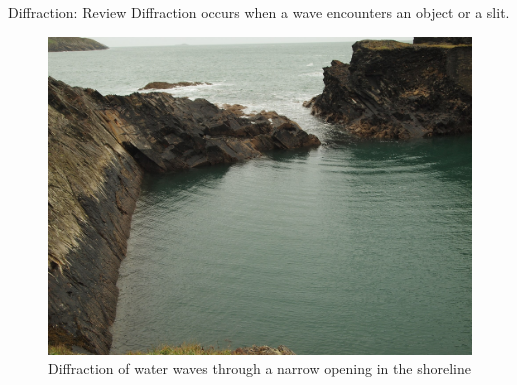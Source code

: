 \documentclass{beamer}
\begin{document}
\begin{frame}{Diffraction: Review}
    \alert{Diffraction} occurs when a wave encounters an object or a slit. 
    \begin{figure}
       \centering
       \includegraphics[scale=.11]{diffraction_irl.jpg}
       \caption{Diffraction of water waves through a narrow opening in the shoreline}
       \label{fig:shoreline}
    \end{figure}
\end{frame}
\end{document}
